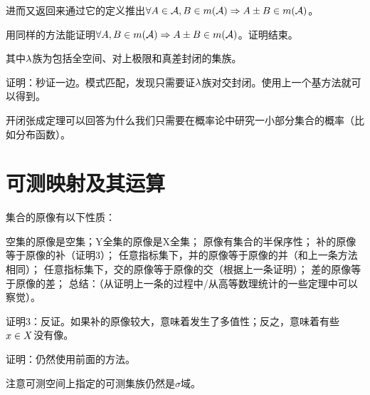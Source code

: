 进而又返回来通过它的定义推出$\forall A\in\mbox{$\mathcal{A}$}, B\in m(\mbox{$\mathcal{A}$})\Rightarrow A\pm B\in m(\mbox{$\mathcal{A}$})$。

用同样的方法能证明$\forall A,B\in m(\mbox{$\mathcal{A}$})\Rightarrow A\pm B\in m(\mbox{$\mathcal{A}$})$。证明结束。



其中$\mbox{$\lambda$}$族为包括全空间、对上极限和真差封闭的集族。

证明：秒证一边。模式匹配，发现只需要证$\mbox{$\lambda$}$族对交封闭。使用上一个基方法就可以得到。




开闭张成定理可以回答为什么我们只需要在概率论中研究一小部分集合的概率（比如分布函数）。


\section{可测映射及其运算}

集合的原像有以下性质：

\begin{wxlb}
\tiao 空集的原像是空集；Y全集的原像是X全集；
\tiao 原像有集合的半保序性；
\tiao 补的原像等于原像的补（证明3）；
\tiao 任意指标集下，并的原像等于原像的并（和上一条方法相同）；
\tiao 任意指标集下，交的原像等于原像的交（根据上一条证明）；
\tiao 差的原像等于原像的差；
\tiao 总结：（从证明上一条的过程中/从高等数理统计的一些定理中可以察觉）。

\end{wxlb}

证明3：反证。如果补的原像较大，意味着发生了多值性；反之，意味着有些$x\in X$没有像。


证明：仍然使用前面的方法。

注意可测空间上指定的可测集族仍然是$\sigma$域。

